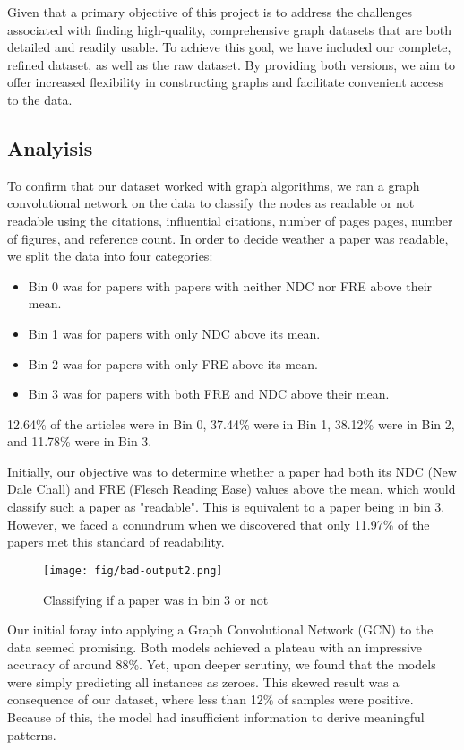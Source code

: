\documentclass[final]{article}
\begin{document}
Given that a primary objective of this project is to address the challenges associated with finding high-quality, comprehensive graph datasets that are both detailed and readily usable. To achieve this goal, we have included our complete, refined dataset, as well as the raw dataset. By providing both versions, we aim to offer increased flexibility in constructing graphs and facilitate convenient access to the data.

\subsection{Analyisis}
To confirm that our dataset worked with graph algorithms, we ran a graph convolutional network on the data to classify the nodes as readable or not readable using the citations, influential citations, number of pages pages, number of figures, and reference count. In order to decide weather a paper was readable, we split the data into four categories:

\begin{itemize}
\item Bin 0 was for papers with papers with neither NDC nor FRE above their mean.
\item Bin 1 was for papers with only NDC above its mean.
\item Bin 2 was for papers with only FRE above its mean.
\item Bin 3 was for papers with both FRE and NDC above their mean.
\end{itemize}

12.64\% of the articles were in Bin 0, 37.44\% were in Bin 1, 38.12\% were in Bin 2, and 11.78\% were in Bin 3. 

Initially, our objective was to determine whether a paper had both its NDC (New Dale Chall) and FRE (Flesch Reading Ease) values above the mean, which would classify such a paper as "readable". This is equivalent to a paper being in bin 3. However, we faced a conundrum when we discovered that only 11.97\% of the papers met this standard of readability.

 \begin{figure}[ht]
  \centering
   \texttt{[image: fig/bad-output2.png]}
  \caption{Classifying if a paper was in bin 3 or not}
 \end{figure} 
\FloatBarrier

Our initial foray into applying a Graph Convolutional Network (GCN) to the data seemed promising. Both models achieved a plateau with an impressive accuracy of around 88\%. Yet, upon deeper scrutiny, we found that the models were simply predicting all instances as zeroes. This skewed result was a consequence of our dataset, where less than 12\% of samples were positive. Because of this, the model had insufficient information to derive meaningful patterns.
\end{document}
